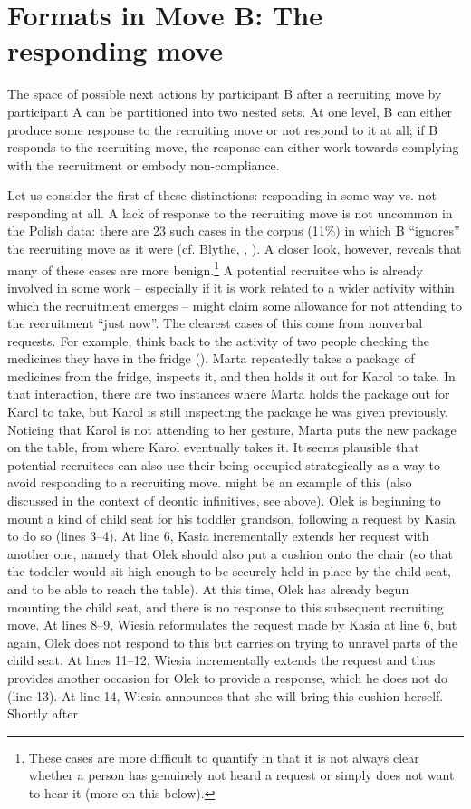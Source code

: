 \documentclass[output=paper]{langsci/langscibook}
\begin{document}
\section{Formats in Move B: The responding move}\label{sec:zinken:4}

The space of possible next actions by participant B after a recruiting move by participant A can be partitioned into two nested sets.  At one level, B can either produce some response to the recruiting move or not respond to it at all; if B responds to the recruiting move, the response can either work towards complying with the recruitment or embody non-compliance.

Let us consider the first of these distinctions: responding in some way vs. not responding at all. A lack of response to the recruiting move is not uncommon in the Polish data: there are 23 such cases in the corpus (11\%) in which B ``ignores'' the recruiting move as it were (cf. Blythe, , ).  A closer look, however, reveals that many of these cases are more benign.\footnote{These cases are more difficult to quantify in that it is not always clear whether a person has genuinely not heard a request or simply does not want to hear it (more on this below).}  A potential recruitee who is already involved in some work -- especially if it is work related to a wider activity within which the recruitment emerges -- might claim some allowance for not attending to the recruitment “just now”. The clearest cases of this come from nonverbal requests.  For example, think back to the activity of two people checking the medicines they have in the fridge ().  Marta repeatedly takes a package of medicines from the fridge, inspects it, and then holds it out for Karol to take.  In that interaction, there are two instances where Marta holds the package out for Karol to take, but Karol is still inspecting the package he was given previously.  Noticing that Karol is not attending to her gesture, Marta puts the new package on the table, from where Karol eventually takes it. It seems plausible that potential recruitees can also use their being occupied strategically as a way to avoid responding to a recruiting move.  might be an example of this (also discussed in the context of deontic infinitives, see  above).  Olek is beginning to mount a kind of child seat for his toddler grandson, following a request by Kasia to do so (lines 3--4).  At line 6, Kasia incrementally extends her request with another one, namely that Olek should also put a cushion onto the chair (so that the toddler would sit high enough to be securely held in place by the child seat, and to be able to reach the table).  At this time, Olek has already begun mounting the child seat, and there is no response to this subsequent recruiting move.  At lines 8--9, Wiesia reformulates the request made by Kasia at line 6, but again, Olek does not respond to this but carries on trying to unravel parts of the child seat.  At lines 11--12, Wiesia incrementally extends the request and thus provides another occasion for Olek to provide a response, which he does not do (line 13).  At line 14, Wiesia announces that she will bring this cushion herself.  Shortly after 
\end{document}
